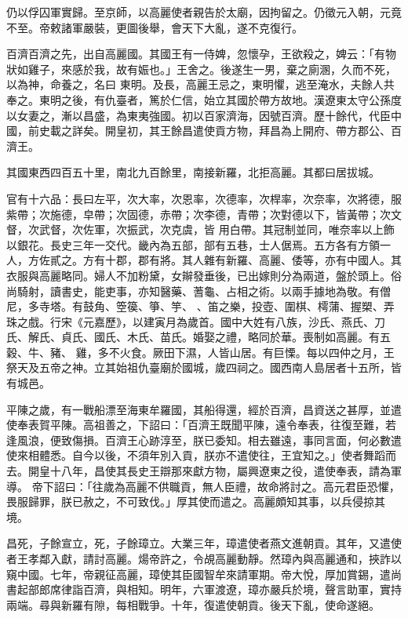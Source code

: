\begin{pinyinscope}
 仍以俘囚軍實歸。至京師，以高麗使者親告於太廟，因拘留之。仍徵元入朝，元竟不至。帝敕諸軍嚴裝，更圖後舉，會天下大亂，遂不克復行。



 百濟百濟之先，出自高麗國。其國王有一侍婢，忽懷孕，王欲殺之，婢云：「有物狀如雞子，來感於我，故有娠也。」王舍之。後遂生一男，棄之廁溷，久而不死，以為神，命養之，名曰
 東明。及長，高麗王忌之，東明懼，逃至淹水，夫餘人共奉之。東明之後，有仇臺者，篤於仁信，始立其國於帶方故地。漢遼東太守公孫度以女妻之，漸以昌盛，為東夷強國。初以百家濟海，因號百濟。歷十餘代，代臣中國，前史載之詳矣。開皇初，其王餘昌遣使貢方物，拜昌為上開府、帶方郡公、百濟王。



 其國東西四百五十里，南北九百餘里，南接新羅，北拒高麗。其都曰居拔城。


官有十六品：長曰左平，次大率，次恩率，次德率，次桿率，次奈率，次將德，服紫帶；次施德，皁帶；次固德，赤帶；次李德，青帶；次對德以下，皆黃帶；次文督，次武督，次佐軍，次振武，次克虞，皆
 用白帶。其冠制並同，唯奈率以上飾以銀花。長史三年一交代。畿內為五部，部有五巷，士人倨焉。五方各有方領一人，方佐貳之。方有十郡，郡有將。其人雜有新羅、高麗、倭等，亦有中國人。其衣服與高麗略同。婦人不加粉黛，女辮發垂後，已出嫁則分為兩道，盤於頭上。俗尚騎射，讀書史，能吏事，亦知醫藥、蓍龜、占相之術。以兩手據地為敬。有僧尼，多寺塔。有鼓角、箜篌、箏、竽、
 、笛之樂，投壺、圍棋、樗蒲、握槊、弄珠之戲。行宋《元嘉歷》，以建寅月為歲首。國中大姓有八族，沙氏、燕氏、刀氏、解氏、貞氏、國氏、木氏、苗氏。婚娶之禮，略同於華。喪制如高麗。有五穀、牛、豬、
 雞，多不火食。厥田下濕，人皆山居。有巨慄。每以四仲之月，王祭天及五帝之神。立其始祖仇臺廟於國城，歲四祠之。國西南人島居者十五所，皆有城邑。



 平陳之歲，有一戰船漂至海東牟羅國，其船得還，經於百濟，昌資送之甚厚，並遣使奉表賀平陳。高祖善之，下詔曰：「百濟王既聞平陳，遠令奉表，往復至難，若逢風浪，便致傷損。百濟王心跡淳至，朕已委知。相去雖遠，事同言面，何必數遣使來相體悉。自今以後，不須年別入貢，朕亦不遣使往，王宜知之。」使者舞蹈而去。開皇十八年，昌使其長史王辯那來獻方物，屬興遼東之役，遣使奉表，請為軍導。
 帝下詔曰：「往歲為高麗不供職貢，無人臣禮，故命將討之。高元君臣恐懼，畏服歸罪，朕已赦之，不可致伐。」厚其使而遣之。高麗頗知其事，以兵侵掠其境。



 昌死，子餘宣立，死，子餘璋立。大業三年，璋遣使者燕文進朝貢。其年，又遣使者王孝鄰入獻，請討高麗。煬帝許之，令覘高麗動靜。然璋內與高麗通和，挾詐以窺中國。七年，帝親征高麗，璋使其臣國智牟來請軍期。帝大悅，厚加賞錫，遣尚書起部郎席律詣百濟，與相知。明年，六軍渡遼，璋亦嚴兵於境，聲言助軍，實持兩端。尋與新羅有隙，每相戰爭。十年，復遣使朝貢。後天下亂，使命遂絕。




\end{pinyinscope}

